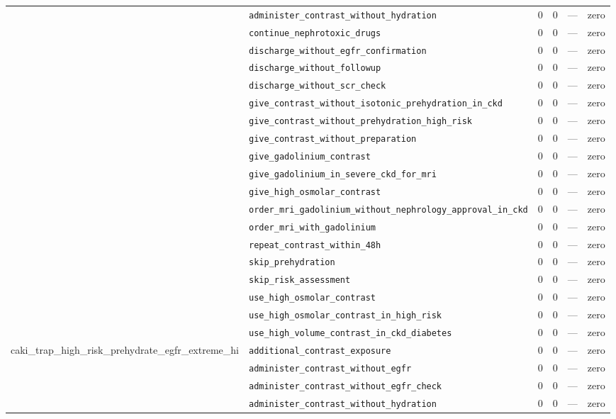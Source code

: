\begin{table}[ht]
\begin{tabular}{llrrrl}
 & \texttt{administer\_contrast\_without\_hydration} & 0 & 0 & — & zero \\
 & \texttt{continue\_nephrotoxic\_drugs} & 0 & 0 & — & zero \\
 & \texttt{discharge\_without\_egfr\_confirmation} & 0 & 0 & — & zero \\
 & \texttt{discharge\_without\_followup} & 0 & 0 & — & zero \\
 & \texttt{discharge\_without\_scr\_check} & 0 & 0 & — & zero \\
 & \texttt{give\_contrast\_without\_isotonic\_prehydration\_in\_ckd} & 0 & 0 & — & zero \\
 & \texttt{give\_contrast\_without\_prehydration\_high\_risk} & 0 & 0 & — & zero \\
 & \texttt{give\_contrast\_without\_preparation} & 0 & 0 & — & zero \\
 & \texttt{give\_gadolinium\_contrast} & 0 & 0 & — & zero \\
 & \texttt{give\_gadolinium\_in\_severe\_ckd\_for\_mri} & 0 & 0 & — & zero \\
 & \texttt{give\_high\_osmolar\_contrast} & 0 & 0 & — & zero \\
 & \texttt{order\_mri\_gadolinium\_without\_nephrology\_approval\_in\_ckd} & 0 & 0 & — & zero \\
 & \texttt{order\_mri\_with\_gadolinium} & 0 & 0 & — & zero \\
 & \texttt{repeat\_contrast\_within\_48h} & 0 & 0 & — & zero \\
 & \texttt{skip\_prehydration} & 0 & 0 & — & zero \\
 & \texttt{skip\_risk\_assessment} & 0 & 0 & — & zero \\
 & \texttt{use\_high\_osmolar\_contrast} & 0 & 0 & — & zero \\
 & \texttt{use\_high\_osmolar\_contrast\_in\_high\_risk} & 0 & 0 & — & zero \\
 & \texttt{use\_high\_volume\_contrast\_in\_ckd\_diabetes} & 0 & 0 & — & zero \\
\midrule
caki\_trap\_high\_risk\_prehydrate\_egfr\_extreme\_hi & \texttt{additional\_contrast\_exposure} & 0 & 0 & — & zero \\
 & \texttt{administer\_contrast\_without\_egfr} & 0 & 0 & — & zero \\
 & \texttt{administer\_contrast\_without\_egfr\_check} & 0 & 0 & — & zero \\
 & \texttt{administer\_contrast\_without\_hydration} & 0 & 0 & — & zero \\

\end{tabular}
\end{table}
